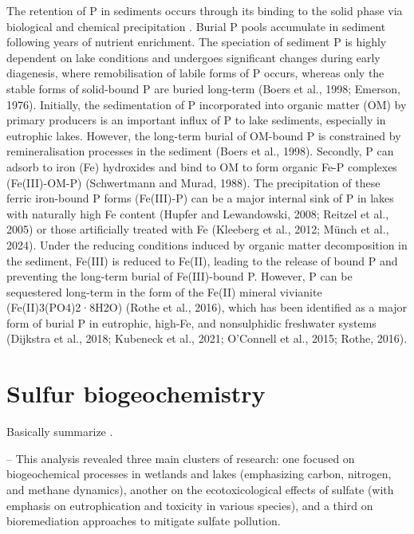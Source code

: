 \documentclass[12pt,twoside]{book}
\begin{document}
The retention of P in sediments occurs through its binding to the solid phase via biological and chemical precipitation \citep{Boers1998, OConnell2020, Parsons2017}. Burial P pools accumulate in sediment following years of nutrient enrichment. The speciation of sediment P is highly dependent on lake conditions and undergoes significant changes during early diagenesis, where remobilisation of labile forms of P occurs, whereas only the stable forms of solid-bound P are buried long-term (Boers et al., 1998; Emerson, 1976). Initially, the sedimentation of P incorporated into organic matter (OM) by primary producers is an important influx of P to lake sediments, especially in eutrophic lakes. However, the long-term burial of OM-bound P is constrained by remineralisation processes in the sediment (Boers et al., 1998). Secondly, P can adsorb to iron (Fe) hydroxides \citep{Gunnars2002} and bind to OM to form organic Fe-P complexes (Fe(III)-OM-P) (Schwertmann and Murad, 1988). The precipitation of these ferric iron-bound P forms (Fe(III)-P) can be a major internal sink of P in lakes with naturally high Fe content (Hupfer and Lewandowski, 2008; Reitzel et al., 2005) or those artificially treated with Fe (Kleeberg et al., 2012; Münch et al., 2024). Under the reducing conditions induced by organic matter decomposition in the sediment, Fe(III) is reduced to Fe(II), leading to the release of bound P and preventing the long-term burial of Fe(III)-bound P. However, P can be sequestered long-term in the form of the Fe(II) mineral vivianite (Fe(II)3(PO4)2·8H2O) (Rothe et al., 2016), which has been identified as a major form of burial P in eutrophic, high-Fe, and nonsulphidic freshwater systems (Dijkstra et al., 2018; Kubeneck et al., 2021; O'Connell et al., 2015; Rothe, 2016).

\section{Sulfur biogeochemistry}\label{sulfur-biogeochemistry}

Basically summarize \citet{Zak2021}.

-- This analysis revealed three main clusters of research: one focused on biogeochemical processes in wetlands and lakes (emphasizing carbon, nitrogen, and methane dynamics), another on the ecotoxicological effects of sulfate (with emphasis on eutrophication and toxicity in various species), and a third on bioremediation approaches to mitigate sulfate pollution.
\end{document}
